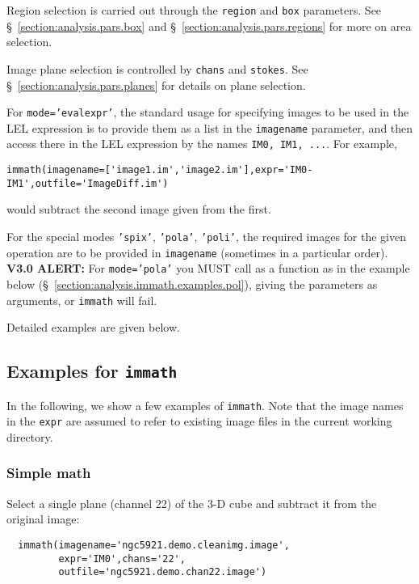 Region selection is carried out through the {\tt region} and {\tt box}
parameters.
See \S~\ref{section:analysis.pars.box} and
\S~\ref{section:analysis.pars.regions} for more on area
selection.

Image plane selection is controlled by {\tt chans} and {\tt stokes}.
See \S~\ref{section:analysis.pars.planes} for details on plane
selection.

For {\tt mode='evalexpr'}, the standard usage for specifying images to
be used in the LEL expression is to provide them as a list in the {\tt imagename}
parameter, and then access there in the LEL expression by the
names {\tt IM0, IM1, ...}.  For example,
\small
\begin{verbatim}
immath(imagename=['image1.im','image2.im'],expr='IM0-IM1',outfile='ImageDiff.im')
\end{verbatim}
\normalsize
would subtract the second image given from the first.

For the special modes {\tt 'spix'}, {\tt 'pola'}, {\tt 'poli'}, the
required images for the given operation are to be provided in 
{\tt imagename} (sometimes in a particular order). 
{\bf V3.0 ALERT:} For {\tt mode='pola'} you MUST call as a function as
in the example below (\S~\ref{section:analysis.immath.examples.pol}), 
giving the parameters as arguments, or {\tt immath} will fail.

Detailed examples are given below.

\subsection{Examples for {\tt immath}}
\label{section:analysis.immath.examples}

In the following, we show a few examples of {\tt immath}. Note that the image
names in the {\tt expr} are assumed to refer to existing image files
in the current working directory.

\subsubsection{Simple math}
\label{section:analysis.immath.examples.math}

Select a single plane (channel 22) of the 3-D cube and  
subtract it from the original image: 
\small
\begin{verbatim}
  immath(imagename='ngc5921.demo.cleanimg.image',
         expr='IM0',chans='22',
         outfile='ngc5921.demo.chan22.image')
\end{verbatim}
\normalsize

